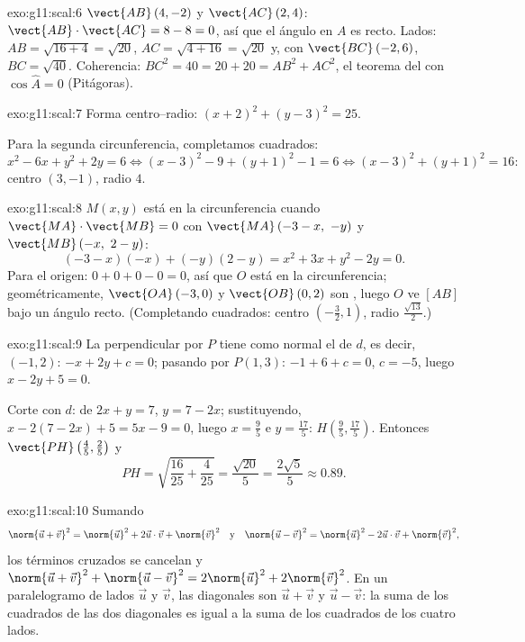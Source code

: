 \begin{solution}{exo:g11:scal:6}
$\vect{AB}\,(4, -2)$ y $\vect{AC}\,(2, 4)$:
$\vect{AB}\cdot\vect{AC} = 8 - 8 = 0$, así que el ángulo en $A$ es recto.
Lados: $AB = \sqrt{16 + 4} = \sqrt{20}$,
$AC = \sqrt{4 + 16} = \sqrt{20}$ y, con $\vect{BC}\,(-2, 6)$,
$BC = \sqrt{40}$. Coherencia: $BC^2 = 40 = 20 + 20 = AB^2 + AC^2$, el
teorema del  con $\cos\widehat A = 0$ (Pitágoras).
\end{solution}

\begin{solution}{exo:g11:scal:7}
Forma centro--radio: $(x + 2)^2 + (y - 3)^2 = 25$.

Para la segunda circunferencia, completamos cuadrados:
\[
x^2 - 6x + y^2 + 2y = 6
\iff (x - 3)^2 - 9 + (y + 1)^2 - 1 = 6
\iff (x-3)^2 + (y+1)^2 = 16 :
\]
centro $(3, -1)$, radio $4$.
\end{solution}

\begin{solution}{exo:g11:scal:8}
$M(x,y)$ está en la circunferencia cuando $\vect{MA}\cdot\vect{MB} = 0$
con $\vect{MA}\,(-3 - x,\ -y)$ y $\vect{MB}\,(-x,\ 2 - y)$:
\[
(-3 - x)(-x) + (-y)(2 - y) = x^2 + 3x + y^2 - 2y = 0 .
\]
Para el origen: $0 + 0 + 0 - 0 = 0$, así que $O$ está en la
circunferencia; geométricamente, $\vect{OA}\,(-3,0)$ y $\vect{OB}\,(0,2)$
son , luego $O$ ve $[AB]$ bajo un ángulo recto. (Completando
cuadrados: centro $\left(-\frac32, 1\right)$, radio
$\frac{\sqrt{13}}{2}$.)
\end{solution}

\begin{solution}{exo:g11:scal:9}
La perpendicular por $P$ tiene como  normal el  de
$d$, es decir, $(-1, 2)$:  $-x + 2y + c = 0$; pasando por
$P(1,3)$: $-1 + 6 + c = 0$, $c = -5$, luego $x - 2y + 5 = 0$.

Corte con $d$: de $2x + y = 7$, $y = 7 - 2x$; sustituyendo,
$x - 2(7 - 2x) + 5 = 5x - 9 = 0$, luego $x = \frac95$ e
$y = \frac{17}5$: $H\left(\frac95, \frac{17}5\right)$. Entonces
$\vect{PH}\left(\frac45, \frac25\right)$ y
\[
PH = \sqrt{\frac{16}{25} + \frac{4}{25}} = \frac{\sqrt{20}}{5}
= \frac{2\sqrt5}{5} \approx 0.89 .
\]
\end{solution}

\begin{solution}{exo:g11:scal:10}
Sumando
\[
\norm{\vec u + \vec v}^2 = \norm{\vec u}^2 + 2\vec u\cdot\vec v +
\norm{\vec v}^2
\quad\text{y}\quad
\norm{\vec u - \vec v}^2 = \norm{\vec u}^2 - 2\vec u\cdot\vec v +
\norm{\vec v}^2,
\]
los términos cruzados se cancelan y
$\norm{\vec u + \vec v}^2 + \norm{\vec u - \vec v}^2 = 2\norm{\vec u}^2 +
2\norm{\vec v}^2$. En un paralelogramo de lados $\vec u$ y $\vec v$, las
diagonales son $\vec u + \vec v$ y $\vec u - \vec v$: la suma de los
cuadrados de las dos diagonales es igual a la suma de los cuadrados de los
cuatro lados.
\end{solution}


